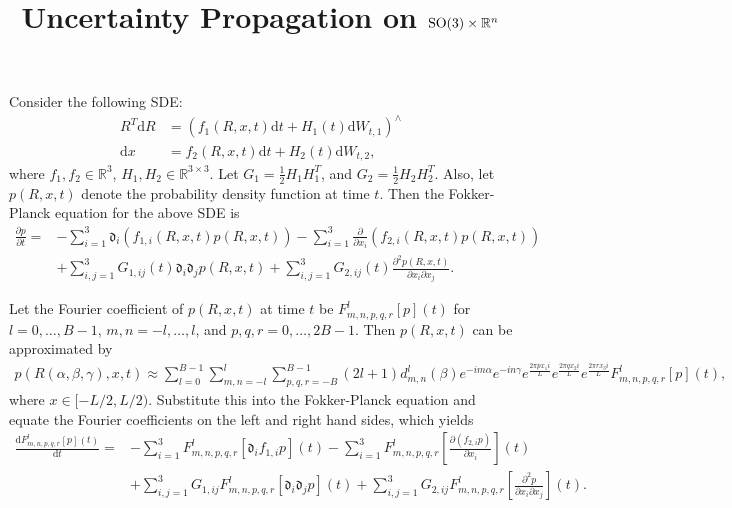 \documentclass[10pt]{article}
\title{\vspace{-4ex}\textbf{Uncertainty Propagation on $\SO\times\real^n$\vspace{-4ex}}}
\date{}
\newcommand{\diff}[1]{\mathrm{d}#1}
\newcommand{\liediff}{\mathfrak{d}}
\newcommand{\real}{\ensuremath{\mathbb{R}}}
\begin{document}
\maketitle

Consider the following SDE:
\begin{align*}
	R^T\diff{R} &= (f_1(R,x,t)\diff{t} + H_1(t)\diff{W}_{t,1})^\wedge \\
	\diff{x} &= f_2(R,x,t)\diff{t} + H_2(t)\diff{W}_{t,2},
\end{align*}
where $f_1,f_2\in\real^3$, $H_1,H_2\in\real^{3\times 3}$.
Let $G_1=\frac{1}{2}H_1H_1^T$, and $G_2=\frac{1}{2}H_2H_2^T$.
Also, let $p(R,x,t)$ denote the probability density function at time $t$.
Then the Fokker-Planck equation for the above SDE is
\begin{align*}
	\frac{\partial p}{\partial t} = &-\sum_{i=1}^3 \liediff_i(f_{1,i}(R,x,t)p(R,x,t)) - \sum_{i=1}^3 \frac{\partial }{\partial x_i} (f_{2,i}(R,x,t)p(R,x,t)) \\
	&+ \sum_{i,j=1}^3 G_{1,ij}(t) \liediff_i\liediff_j p(R,x,t) + \sum_{i,j=1}^3 G_{2,ij}(t) \frac{\partial^2 p(R,x,t)}{\partial x_i \partial x_j}.
\end{align*}

Let the Fourier coefficient of $p(R,x,t)$ at time $t$ be $F^l_{m,n,p,q,r}[p](t)$ for $l = 0,\ldots,B-1$, $m,n = -l,\ldots,l$, and $p,q,r = 0,\ldots,2B-1$.
Then $p(R,x,t)$ can be approximated by
\begin{align*}
	p(R(\alpha,\beta,\gamma),x,t) \approx \sum_{l=0}^{B-1} \sum_{m,n=-l}^l \sum_{p,q,r=-B}^{B-1} (2l+1)d_{m,n}^l(\beta) e^{-im\alpha} e^{-in\gamma} e^{\frac{2\pi px_1 i}{L}} e^{\frac{2\pi qx_2 i}{L}} e^{\frac{2\pi rx_3 i}{L}} F^l_{m,n,p,q,r}[p](t),
\end{align*}
where $x\in[-L/2,L/2)$.
Substitute this into the Fokker-Planck equation and equate the Fourier coefficients on the left and right hand sides, which yields
\begin{align*}
	\frac{\diff{F^{l}_{m,n,p,q,r}[p](t)}}{\diff{t}} = &-\sum_{i=1}^3 F^l_{m,n,p,q,r}[\liediff_if_{1,i}p](t) - \sum_{i=1}^3 F^l_{m,n,p,q,r}\left[ \frac{\partial (f_{2,i}p)}{\partial x_i} \right](t) \\
	&+ \sum_{i,j=1}^3 G_{1,ij} F^l_{m,n,p,q,r}[\liediff_i\liediff_jp](t) + \sum_{i,j=1}^3 G_{2,ij} F^l_{m,n,p,q,r} \left[ \frac{\partial^2 p}{\partial x_i \partial x_j} \right](t).
\end{align*}
\end{document}
